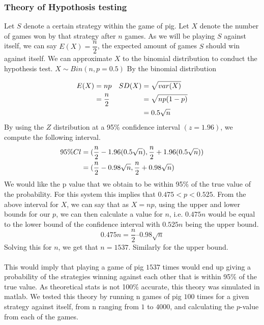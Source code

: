 \documentclass[a4paper,titlepage]{article}
\begin{document}
\subsubsection{Theory of Hypothosis testing}
Let $S$ denote a certain strategy within the game of pig. 
Let $X$ denote the number of games won by that strategy after $n$ games. 
As we will be playing $S$ against itself, we can say $E(X) = 
\dfrac{n}{2}$, the expected amount of games $S$ should win against itself. 
We can approximate $X$ to the binomial distribution to conduct the hypothesis test. 
$X \sim Bin(n , p=0.5)$ 
By the binomial distribution

\begin{align}
E(X) &= np & SD(X) &= \sqrt{var(X)}\notag\\
&= \dfrac{n}{2} & &= \sqrt{np(1-p)}\notag\\
& & &= 0.5\sqrt{n} \notag
\end{align}
By using the $Z$ distribution at a 95\% confidence interval $(z=1.96)$, we compute the following interval. 
\begin{align}
95\%Cl &= (\dfrac{n}{2} -1.96(0.5\sqrt{n}), \dfrac{n}{2} +1.96(0.5\sqrt{n}))\notag\\
&= (\dfrac{n}{2}-0.98\sqrt{n}, \dfrac{n}{2}+0.98\sqrt{n})
\notag
\end{align}
We would like the p value that we obtain to be within 95\% of the true value of the probability. For this system this implies that $0.475<p<0.525$. From the above interval for $X$, we can say that as $X=np$, using the upper and lower bounds for our $p$, we can then calculate a value for $n$, i.e. $0.475n$ would be equal to the lower bound of the confidence interval with $0.525n$ being the upper bound.
$$0.475n = \dfrac{n}{2} –0.98\sqrt{n}$$
Solving this for $n$, we get that $n=1537$. Similarly for the upper bound.\\ \\
This would imply that playing a game of pig $1537$ times would end up giving a probability of the strategies winning against each other that is within 95\% of the true value. As theoretical stats is not 100\% accurate, this theory was simulated in matlab. We tested this theory by running n games of pig $100$ times for a given strategy against itself, from n ranging from $1$ to $4000$, and calculating the $p$-value from each of the games.\\ \\
\end{document}
